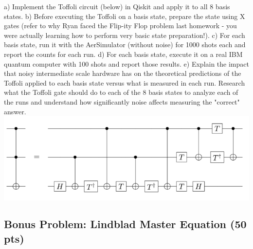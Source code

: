 \documentclass[12pt]{article}
\begin{document}
a) Implement the Toffoli circuit (below) in Qiskit and apply it to all 8 basis states.
b) Before executing the Toffoli on a basis state, prepare the state using X gates (refer to why Ryan faced the Flip-ity Flop problem last homework \smiley{} - you were actually learning how to perform very basic state preparation!).
c) For each basis state, run it with the AerSimulator (without noise) for 1000 shots each and report the counts for each run.
d) For each basis state, execute it on a real IBM quantum computer with 100 shots and report those results.
e) Explain the impact that noisy intermediate scale hardware has on the theoretical predictions of the Toffoli applied to each basis state versus what is measured in each run. Research what the Toffoli gate should do to each of the 8 basis states to analyze each of the runs and understand how significantly noise affects measuring the "correct" answer.
\includegraphics[]{toff.png}
\subsection*{Bonus Problem: Lindblad Master Equation (50 pts)}
\end{document}
